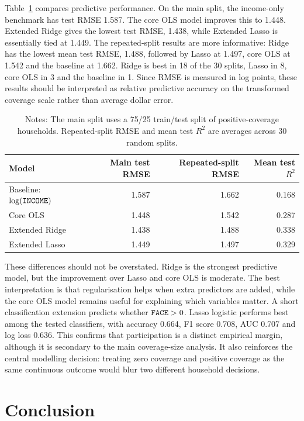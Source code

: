 \documentclass[10pt,a4paper]{article}
\newcommand{\mtt}[1]{\text{\texttt{#1}}}
\begin{document}
Table~\ref{tab:pred} compares predictive performance. On the main split, the income-only benchmark has test RMSE 1.587. The core OLS model improves this to 1.448. Extended Ridge gives the lowest test RMSE, 1.438, while Extended Lasso is essentially tied at 1.449. The repeated-split results are more informative: Ridge has the lowest mean test RMSE, 1.488, followed by Lasso at 1.497, core OLS at 1.542 and the baseline at 1.662. Ridge is best in 18 of the 30 splits, Lasso in 8, core OLS in 3 and the baseline in 1. Since RMSE is measured in log points, these results should be interpreted as relative predictive accuracy on the transformed coverage scale rather than average dollar error.

\begin{table}[h]
\centering
\caption{Predictive performance for $\log(\mtt{FACE})$}
\label{tab:pred}
\begin{tabular}{lrrr}
\toprule
Model & Main test RMSE & Repeated-split RMSE & Mean test $R^2$ \\
\midrule
Baseline: $\log(\mtt{INCOME})$ & 1.587 & 1.662 & 0.168 \\
Core OLS & 1.448 & 1.542 & 0.287 \\
Extended Ridge & 1.438 & 1.488 & 0.338 \\
Extended Lasso & 1.449 & 1.497 & 0.329 \\
\bottomrule
\end{tabular}
\caption*{\footnotesize Notes: The main split uses a 75/25 train/test split of positive-coverage households. Repeated-split RMSE and mean test $R^2$ are averages across 30 random splits.}
\end{table}

These differences should not be overstated. Ridge is the strongest predictive model, but the improvement over Lasso and core OLS is moderate. The best interpretation is that regularisation helps when extra predictors are added, while the core OLS model remains useful for explaining which variables matter. A short classification extension predicts whether $\mtt{FACE}>0$. Lasso logistic performs best among the tested classifiers, with accuracy 0.664, F1 score 0.708, AUC 0.707 and log loss 0.636. This confirms that participation is a distinct empirical margin, although it is secondary to the main coverage-size analysis. It also reinforces the central modelling decision: treating zero coverage and positive coverage as the same continuous outcome would blur two different household decisions.

\section{Conclusion}
\end{document}
